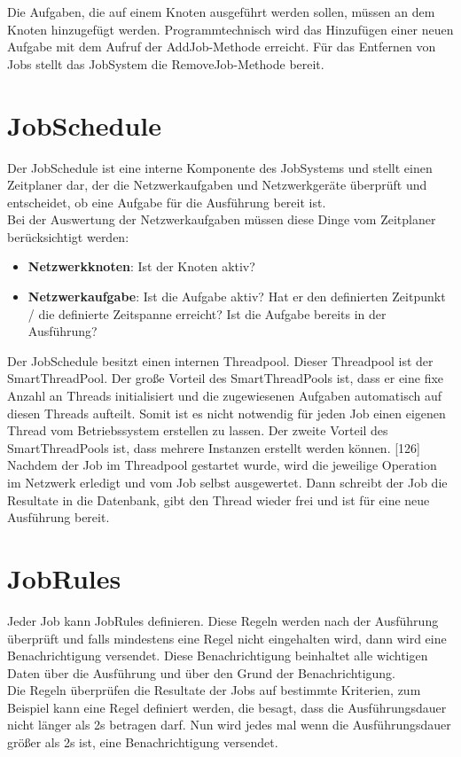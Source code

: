 \documentclass[12pt,a4paper]{report}
\begin{document}
\begin{onehalfspace}
Die Aufgaben, die auf einem Knoten ausgeführt werden sollen, müssen an dem Knoten hinzugefügt werden. Programmtechnisch wird das Hinzufügen einer neuen Aufgabe mit dem Aufruf der AddJob-Methode erreicht. Für das Entfernen von Jobs stellt das JobSystem die RemoveJob-Methode bereit.

\section{JobSchedule}

Der JobSchedule ist eine interne Komponente des JobSystems und stellt einen Zeitplaner dar, der die Netzwerkaufgaben und Netzwerkgeräte überprüft und entscheidet, ob eine Aufgabe für die Ausführung bereit ist.\\
Bei der Auswertung der Netzwerkaufgaben müssen diese Dinge vom Zeitplaner berücksichtigt werden:

\begin{itemize}
\item \textbf{Netzwerkknoten}: Ist der Knoten aktiv?
\item \textbf{Netzwerkaufgabe}: Ist die Aufgabe aktiv? Hat er den definierten Zeitpunkt / die definierte Zeitspanne erreicht? Ist die Aufgabe bereits in der Ausführung?
\end{itemize}

Der JobSchedule besitzt einen internen Threadpool. Dieser Threadpool ist der SmartThreadPool. Der große Vorteil des SmartThreadPools ist, dass er eine fixe Anzahl an Threads initialisiert und die zugewiesenen Aufgaben automatisch auf diesen Threads aufteilt. Somit ist es nicht notwendig für jeden Job einen eigenen Thread vom Betriebssystem erstellen zu lassen. Der zweite Vorteil des SmartThreadPools ist, dass mehrere Instanzen erstellt werden können. [126]\\
Nachdem der Job im Threadpool gestartet wurde, wird die jeweilige Operation im Netzwerk erledigt und vom Job selbst ausgewertet. Dann schreibt der Job die Resultate in die Datenbank, gibt den Thread wieder frei und ist für eine neue Ausführung bereit.

\section{JobRules}

Jeder Job kann JobRules definieren. Diese Regeln werden nach der Ausführung überprüft und falls mindestens eine Regel nicht eingehalten wird, dann wird eine Benachrichtigung versendet. Diese Benachrichtigung beinhaltet alle wichtigen Daten über die Ausführung und über den Grund der Benachrichtigung.\\
Die Regeln überprüfen die Resultate der Jobs auf bestimmte Kriterien, zum Beispiel kann eine Regel definiert werden, die besagt, dass die Ausführungsdauer nicht länger als 2s betragen darf. Nun wird jedes mal wenn die Ausführungsdauer größer als 2s ist, eine Benachrichtigung versendet.


\end{onehalfspace}
\end{document}
